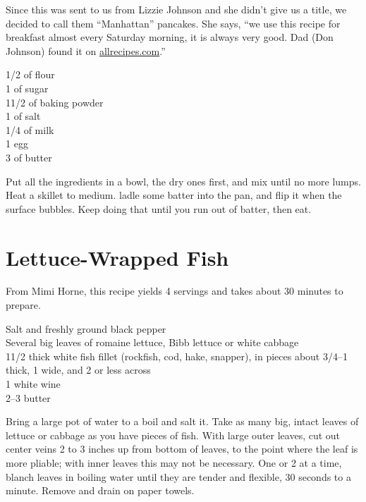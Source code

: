 \begin{open}
    Since this was sent to us from Lizzie Johnson and she didn't give us a title, we decided to call them ``Manhattan'' pancakes. She says, ``we use this recipe for breakfast almost every Saturday morning, it is always very good. Dad (Don Johnson) found it on \url{allrecipes.com}.''
\end{open}
\begin{ingredients}
    \SI{1/2}{\cup} of flour\\
    \SI{1}{\tblspoon} of sugar\\
    1\SI{1/2}{\teaspoon} of baking powder\\
    \SI{1}{\teaspoon} of salt\\
    \SI{1/4}{\cup} of milk\\
    1 egg\\
    \SI{3}{\tblspoon} of butter
\end{ingredients}
Put all the ingredients in a bowl, the dry ones first, and mix until no more lumps. Heat a skillet to medium. ladle some batter into the pan, and flip it when the surface bubbles. Keep doing that until you run out of batter, then eat.

\section{Lettuce-Wrapped Fish
}

\begin{open}
    From Mimi Horne, this recipe yields 4 servings and takes about 30 minutes to prepare.
\end{open}
\begin{ingredients}
    Salt and freshly ground black pepper\\
    Several big leaves of romaine lettuce, Bibb lettuce or white cabbage\\
    1\SI{1/2}{\pound} thick white fish fillet (rockfish, cod, hake, snapper), in
    pieces about \SIrange[range-phrase={ to }]{3/4}{1}{\inch} thick,
    \SI{1}{\inch} wide, and \SI{2}{\inch} or less across\\
    \SI{1}{\cup} white wine\\
    \SIrange[range-phrase={ to }]{2}{3}{\tblspoon} butter
\end{ingredients}
Bring a large pot of water to a boil and salt it. Take as many big, intact
leaves of lettuce or cabbage as you have pieces of fish. With large outer
leaves, cut out center veins 2 to 3 inches up from bottom of leaves, to the
point where the leaf is more pliable; with inner leaves this may not be
necessary. One or 2 at a time, blanch leaves in boiling water until they are
tender and flexible, 30 seconds to a minute. Remove and drain on paper towels.

